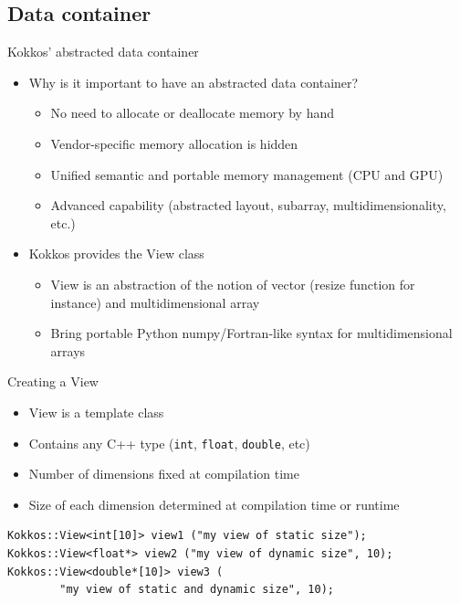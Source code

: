 \documentclass[aspectratio=169]{beamer}
\begin{document}

\subsection[Data container]{Data container}


\begin{frame}[fragile]{Kokkos' abstracted data container}
    \begin{itemize}
        \item Why is it important to have an abstracted data container?
        \begin{itemize}
            \item No need to allocate or deallocate memory by hand
            \item Vendor-specific memory allocation is hidden
            \item Unified semantic and portable memory management (CPU and GPU)
            \item Advanced capability (abstracted layout, subarray, multidimensionality, etc.)
        \end{itemize}
        \item Kokkos provides the View class
        \begin{itemize}
            \item View is an abstraction of the notion of vector (resize function for instance) and multidimensional array
            \item Bring portable Python numpy/Fortran-like syntax for multidimensional arrays
        \end{itemize}
    \end{itemize}
\end{frame}


\begin{frame}[fragile]{Creating a View}
    \begin{itemize}
        \item View is a template class
        \item Contains any C++ type (\texttt{int}, \texttt{float}, \texttt{double}, etc)
        \item Number of dimensions fixed at compilation time
        \item Size of each dimension determined at compilation time or runtime
    \end{itemize}
    \begin{verbatim}
Kokkos::View<int[10]> view1 ("my view of static size");
Kokkos::View<float*> view2 ("my view of dynamic size", 10);
Kokkos::View<double*[10]> view3 (
        "my view of static and dynamic size", 10);
    \end{verbatim}
\end{frame}
\end{document}
